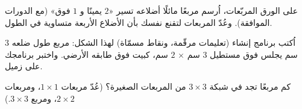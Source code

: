 \begin{exercise}[$\star\star$]\label{exo:g3:shapes:9}
على الورق المربّعات، اُرسم مربعًا مائلًا أضلاعه تسير «$2$
يمينًا و $1$ فوق» (مع الدورات الموافقة). وعُدّ المربعات لتقنع
نفسك بأن الأضلاع الأربعة متساوية في الطول.
\end{exercise}

\begin{exercise}[$\star\star$]\label{exo:g3:shapes:10}
اُكتب برنامج إنشاء (تعليمات مرقّمة، ونقاط مسمّاة)
لهذا الشكل: مربع طول ضلعه $3$ سم يجلس فوق مستطيل
$3$ سم $\times$ $2$ سم، كبيت فوق طابقه الأرضي. واختبر برنامجك
على زميل.
\end{exercise}

\begin{exercise}[$\star\star$]\label{exo:g3:shapes:11}
كم مربعًا تجد في شبكة $3 \times 3$ من المربعات
الصغيرة؟ (عُدّ مربعات $1 \times 1$، ومربعات $2 \times 2$،
ومربع $3 \times 3$.)
\end{exercise}
